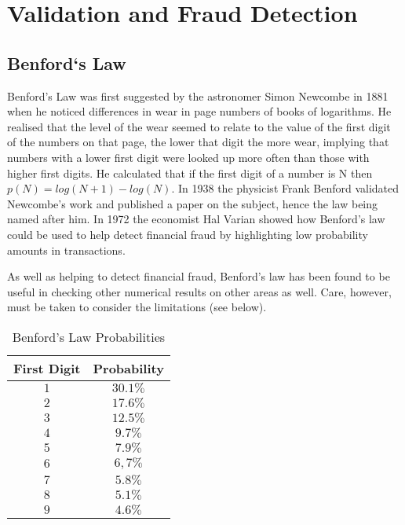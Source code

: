 \chapter{Validation and Fraud Detection}

\section{Benford`s Law}
Benford's Law was first suggested by the astronomer Simon Newcombe   
in 1881 when he noticed differences in wear in page numbers of books of logarithms.  He realised that the level of the wear seemed to relate to the value of the first digit of the numbers on that page, the lower that digit the more wear, implying that numbers with a lower first digit were looked up more often than those with higher first digits.  He calculated that if the first digit of a number is N then $p(N) = log(N+1) - log(N) $.  In 1938 the physicist Frank Benford  validated Newcombe's work and published a paper on the subject, hence the law being named after him.  In 1972 the economist Hal Varian showed how Benford's law could be used to help detect financial fraud by highlighting low probability amounts in transactions.

As well as helping to detect financial fraud, Benford's law has been found to be useful in checking other numerical results on other areas as well.  Care, however, must be taken to consider the limitations (see below).

\begin{table}[hbt]
    \centering
    \begin{tabular}{c|c}
    \hline
    First Digit & Probability \\
    \hline\hline
       $1$  & $30.1\%$ \\ 
       $2$  & $17.6\%$ \\  
       $3$ & $12.5\%$ \\
       $4$ & $9.7\%$ \\
       $5$ & $7.9\%$ \\
       $6$ & $6,7\%$ \\
       $7$ & $5.8\%$ \\
       $8$ & $5.1\%$ \\
       $9$ & $4.6\%$ \\
       \hline
    \end{tabular}
    \caption{Benford's Law Probabilities}
    \label{tab:Benfords_Law_Probabilities}
\end{table}

